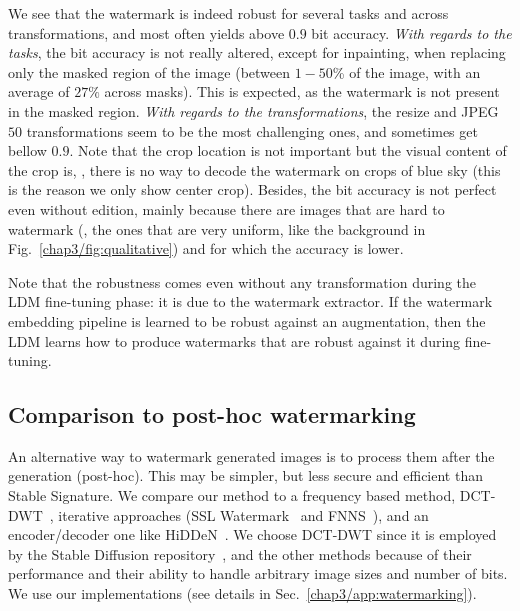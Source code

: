 We see that the watermark is indeed robust for several tasks and across transformations, and most often yields above $0.9$ bit accuracy.
\emph{With regards to the tasks}, the bit accuracy is not really altered, except for inpainting, when replacing only the masked region of the image (between $1-50$\% of the image, with an average of $27\%$ across masks).
This is expected, as the watermark is not present in the masked region.
\emph{With regards to the transformations}, the resize and JPEG $50$ transformations seem to be the most challenging ones, and sometimes get bellow $0.9$.
Note that the crop location is not important but the visual content of the crop is, \eg, there is no way to decode the watermark on crops of blue sky (this is the reason we only show center crop).
Besides, the bit accuracy is not perfect even without edition, mainly because there are images that are hard to watermark (\eg, the ones that are very uniform, like the background in Fig.~\ref{chap3/fig:qualitative}) and for which the accuracy is lower.

Note that the robustness comes even without any transformation during the LDM fine-tuning phase:
it is due to the watermark extractor.
If the watermark embedding pipeline is learned to be robust against an augmentation, then the LDM learns how to produce watermarks that are robust against it during fine-tuning.






\subsection{Comparison to post-hoc watermarking}\label{chap3/subsec:watermarking}

An alternative way to watermark generated images is to process them after the generation (post-hoc). 
This may be simpler, but less secure and efficient than Stable Signature.
We compare our method to a frequency based method, DCT-DWT~\cite{invisible-watermark},
iterative approaches (SSL Watermark~\citep{fernandez2022sslwatermarking} and FNNS~\citep{kishore2021fixed}), and an encoder/decoder one like HiDDeN~\citep{zhu2018hidden}.
We choose DCT-DWT since it is employed by the Stable Diffusion repository~\citep{2022stablediffusion}, and the other methods because of their performance and their ability to handle arbitrary image sizes and number of bits.
We use our implementations (see details in Sec.~\ref{chap3/app:watermarking}).

